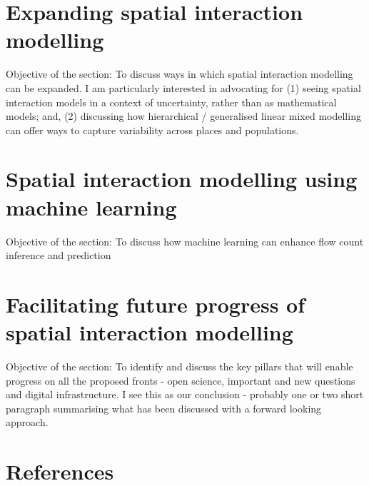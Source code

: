 \documentclass[11pt,letterpaper]{article}
\begin{document}
\hypertarget{expanding-spatial-interaction-modelling}{%
\section{Expanding spatial interaction modelling}\label{expanding-spatial-interaction-modelling}}

Objective of the section: To discuss ways in which spatial interaction modelling can be expanded.
I am particularly interested in advocating for (1) seeing spatial interaction models in a context of uncertainty, rather than as mathematical models; and, (2) discussing how hierarchical / generalised linear mixed modelling can offer ways to capture variability across places and populations.

\hypertarget{spatial-interaction-modelling-using-machine-learning}{%
\section{Spatial interaction modelling using machine learning}\label{spatial-interaction-modelling-using-machine-learning}}

Objective of the section: To discuss how machine learning can enhance flow count inference and prediction

\hypertarget{facilitating-future-progress-of-spatial-interaction-modelling}{%
\section{Facilitating future progress of spatial interaction modelling}\label{facilitating-future-progress-of-spatial-interaction-modelling}}

Objective of the section: To identify and discuss the key pillars that will enable progress on all the proposed fronts - open science, important and new questions and digital infrastructure.
I see this as our conclusion - probably one or two short paragraph summarising what has been discussed with a forward looking approach.

\hypertarget{references}{%
\section*{References}\label{references}}
\end{document}
